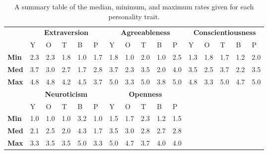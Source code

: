 \begin{table}[hbt!]
    \renewcommand{\arraystretch}{1}
    \begin{center}
        \begin{tabular}{p{}|
        p{}|p{}|p{}|p{}|p{}||
        p{}|p{}|p{}|p{}|p{}||
        p{}|p{}|p{}|p{}|p{}|}
            \cline{2-16}
            & \multicolumn{5}{c||}{\textbf{Extraversion}} & \multicolumn{5}{c||}{\textbf{Agreeableness}}
            & \multicolumn{5}{c|}{\textbf{Conscientiousness}} \\
            \cline{2-16}
            & Y & O & T & B & P & Y & O & T & B & P & Y & O & T & B & P     \\
            \cline{2-16}
            \textbf{Min}    & 2.3 & 2.3 & 1.8 & 1.0 & 1.7 & 1.8 & 1.0 & 2.0 & 1.0 & 2.5 & 1.3 & 1.8 & 1.7 & 1.2 & 2.0  \\
            \textbf{Med}    & 3.7 & 3.0 & 2.7 & 1.7 & 2.8 & 3.7 & 2.3 & 3.5 & 2.0 & 4.0 & 3.5 & 2.5 & 3.7 & 2.2 & 3.5  \\
            \textbf{Max}    & 4.8 & 4.8 & 4.2 & 4.5 & 3.7 & 5.0 & 3.3 & 5.0 & 3.8 & 5.0 & 4.8 & 3.3 & 5.0 & 4.7 & 5.0 \\
            \cline{2-16}
            \cline{2-11}
            &  \multicolumn{5}{|c||}{\textbf{Neuroticism}} & \multicolumn{5}{|c||}{\textbf{Openness}} \\
            \cline{2-11}
            & Y & O & T & B & P & Y & O & T & B & P            \\
            \cline{2-11}
            \textbf{Min}    & 1.0 & 1.0 & 1.0 & 3.2 & 1.0 & 1.5 & 1.7 & 2.3 & 1.2 & 1.5    \\
            \textbf{Med}    & 2.1 & 2.5 & 2.0 & 4.3 & 1.7 & 3.5 & 3.0 & 2.8 & 2.7 & 2.8    \\
            \textbf{Max}    & 3.3 & 3.5 & 3.5 & 5.0 & 3.3 & 5.0 & 4.7 & 3.7 & 4.0 & 4.0    \\
            \cline{2-11}
        \end{tabular}
        \caption{A summary table of the median, minimum, and maximum rates given for each personality trait.}
        \label{table:medianML1}
    \end{center}
\end{table}
